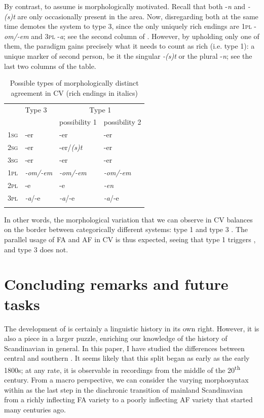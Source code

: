 \documentclass[output=paper,colorlinks,citecolor=brown,draft,draftmode]{langscibook}
\begin{document}
By contrast, to assume  is morphologically motivated. Recall that both -\textit{n} and \textit{-(s)t} are only occasionally present in the area. Now, disregarding both at the same time demotes the  system to type 3, since the only uniquely rich endings are 1\textsc{pl} -\textit{om/-em} and 3\textsc{pl} -\textit{a}; see the second column of . However, by upholding only one of them, the paradigm gains precisely what it needs to count as rich (i.e. type 1): a unique marker of second person, be it the singular \textit{-(s)t} or the plural -\textit{n}; see the last two columns of the table.


\begin{table}
\caption{Possible types of morphologically distinct agreement in CV (rich endings in italics)\label{tab:petzell:4}}
\begin{tabular}{>{\scshape}llll}
\lsptoprule
& Type 3 & \multicolumn{2}{c}{Type 1}\\\cmidrule(lr){3-4}
&  & possibility 1 & possibility 2\\
\midrule
1sg & -er & -er & -er\\
2sg & -er & -er/\textit{(s)t} & -er\\
3sg & -er & -er & -er\\
1pl & \textit{-om/-em} & \textit{-om/-em} & \textit{-om/-em}\\
2pl & -e & -e & \textit{-en}\\
3pl & \textit{-a}/-e & \textit{-a}/-e & \textit{-a}/-e\\
\lspbottomrule
\end{tabular}
\end{table}

In other words, the morphological variation that we can observe in CV balances on the border between categorically different systems: type 1 and type 3 . The parallel usage of FA and AF in CV is thus expected, seeing that type 1  triggers , and type 3 does not.


\section{Concluding remarks and future tasks}\label{sec:petzell:6}


The development of  is certainly a linguistic history in its own right. However, it is also a piece in a larger puzzle, enriching our knowledge of the history of Scandinavian in general. In this paper, I have studied the differences between central and southern . It seems likely that this  split began as early as the early 1800s; at any rate, it is observable in recordings from the middle of the 20\textsuperscript{th} century. From a macro perspective, we can consider the varying morphosyntax within  as the last step in the diachronic transition of mainland Scandinavian from a richly inflecting FA variety to a poorly inflecting AF variety that started many centuries ago. 
\end{document}
